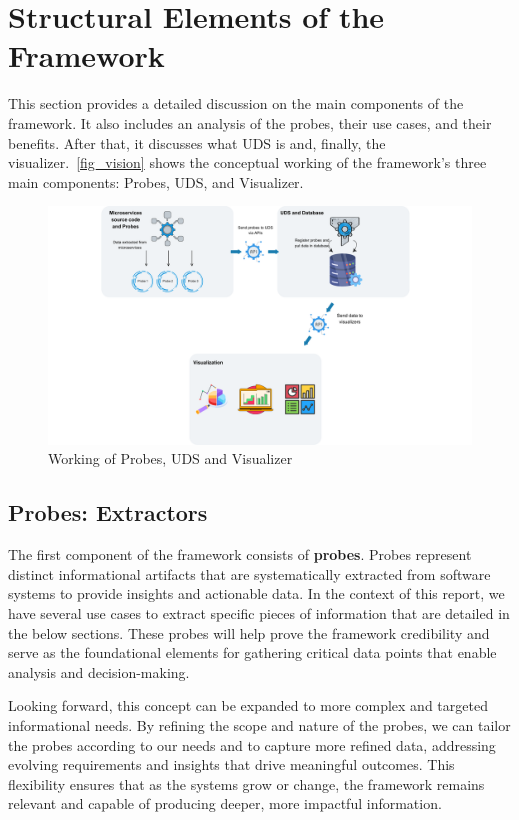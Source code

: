 \section{Structural Elements of the Framework}\label{sec:tech-strategy}

This section provides a detailed discussion on the main components of the framework. It also includes an analysis of the probes, their use cases, and their benefits. After that, it discusses what UDS is and, finally, the visualizer.~\autoref{fig_vision} shows the conceptual working of the framework's three main components: Probes, UDS, and Visualizer.

\begin{figure}[H]
    \centering
    \includegraphics[width=1\textwidth]{figures/vision.png}
    \caption[Framework working]{Working of Probes, UDS and Visualizer}
	\label{fig_vision}
\end{figure}

\subsection{Probes: Extractors}\label{sec:component-probes}

The first component of the framework consists of \textbf{probes}. Probes represent distinct informational artifacts that are systematically extracted from software systems to provide insights and actionable data. In the context of this report, we have several use cases to extract specific pieces of information that are detailed in the below sections. These probes will help prove the framework credibility and serve as the foundational elements for gathering critical data points that enable analysis and decision-making. 

Looking forward, this concept can be expanded to more complex and targeted informational needs. By refining the scope and nature of the probes, we can tailor the probes according to our needs and to capture more refined data, addressing evolving requirements and insights that drive meaningful outcomes. This flexibility ensures that as the systems grow or change, the framework remains relevant and capable of producing deeper, more impactful information.

